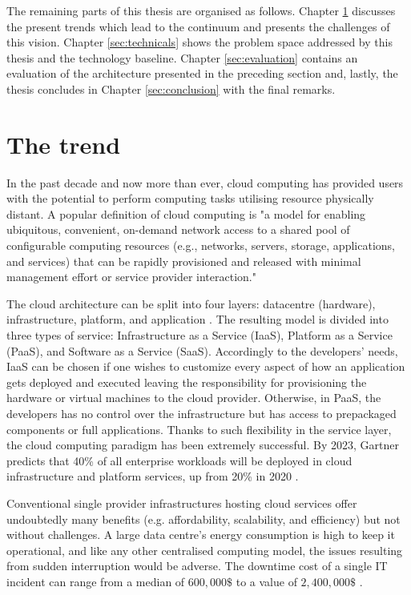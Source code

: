 The remaining parts of this thesis are organised as follows. Chapter \ref{sec:challenges} discusses the present trends which lead to the continuum and presents the challenges of this vision. Chapter \ref{sec:technicals} shows the problem space addressed by this thesis and the technology baseline. Chapter \ref{sec:evaluation} contains an evaluation of the architecture presented in the preceding section and, lastly, the thesis concludes in Chapter \ref{sec:conclusion} with the final remarks.

\chapter{The trend}
\label{sec:challenges}

In the past decade and now more than ever, cloud computing has provided users with the potential to perform computing tasks utilising resource physically distant. A popular definition of cloud computing \cite{cloud-def} is "a model for enabling ubiquitous, convenient, on-demand network access to a shared pool of configurable computing resources (e.g., networks, servers, storage, applications, and services) that can be rapidly provisioned and released with minimal management effort or service provider interaction."

The cloud architecture can be split into four layers: datacentre (hardware), infrastructure, platform, and application \cite{cloud-computing}. The resulting model is divided into three types of service: Infrastructure as a Service (IaaS), Platform as a Service (PaaS), and Software as a Service (SaaS). Accordingly to the developers' needs, IaaS can be chosen if one wishes to customize every aspect of how an application gets deployed and executed leaving the responsibility for provisioning the hardware or virtual machines to the cloud provider. Otherwise, in PaaS, the developers has no control over the infrastructure but has access to prepackaged components or full applications. Thanks to such flexibility in the service layer, the cloud computing paradigm has been extremely successful. By 2023, Gartner predicts that 40\% of all enterprise workloads will be deployed in cloud infrastructure and platform services, up from 20\% in 2020 \cite{gartner-cloud-edge}.

Conventional single provider infrastructures hosting cloud services offer undoubtedly many benefits (e.g. affordability, scalability, and efficiency) but not without challenges. A large data centre's energy consumption is high to keep it operational, and like any other centralised computing model, the issues resulting from sudden interruption would be adverse. The downtime cost of a single IT incident can range from a median of $600,000\$$ to a value of $2,400,000\$$ \cite{downtime-cost}.

